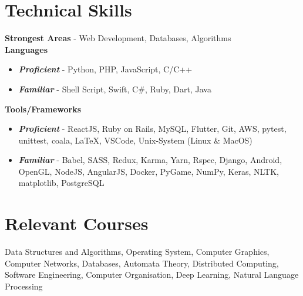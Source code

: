 \documentclass[margin, centered]{res}
\begin{document}
\begin{resume}
    \section{Technical \hspace{2mm} Skills}
    \textbf{Strongest Areas} - Web Development, Databases, Algorithms \\
    \textbf{Languages}
    \begin{itemize}
        \item \textbf{\textsl{Proficient}} - Python, PHP, JavaScript, C/C++
        \item \textbf{\textsl{Familiar}} - Shell Script, Swift, C\#, Ruby, Dart, Java
    \end{itemize}
    \textbf{Tools/Frameworks}
    \begin{itemize}
        \item \textbf{\textsl{Proficient}} - ReactJS, Ruby on Rails, MySQL, Flutter, Git, AWS, pytest, unittest, coala, \LaTeX, VSCode, Unix-System (Linux \& MacOS)
        \item \textbf{\textsl{Familiar}} - Babel, SASS, Redux, Karma, Yarn, Rspec, Django, Android, OpenGL, NodeJS, AngularJS, Docker, PyGame, NumPy, Keras, NLTK, matplotlib, PostgreSQL
    \end{itemize}

    \section{Relevant \hspace{2mm} Courses}
    Data Structures and Algorithms, Operating System, Computer Graphics, Computer Networks,
    Databases, Automata Theory, Distributed Computing, Software Engineering, Computer Organisation, Deep Learning, Natural Language Processing


\end{resume}
\end{document}
